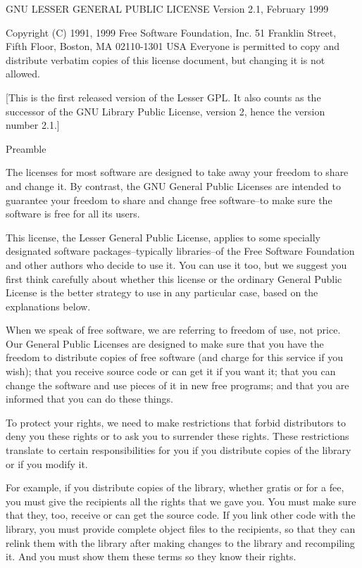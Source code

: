 GNU LESSER GENERAL PUBLIC LICENSE Version 2.1, February 1999

Copyright (C) 1991, 1999 Free Software Foundation, Inc. 51 Franklin Street, Fifth Floor, Boston, MA 02110-1301 USA Everyone is permitted to copy and distribute verbatim copies of this license document, but changing it is not allowed.

\mbox{[}This is the first released version of the Lesser GPL. It also counts as the successor of the GNU Library Public License, version 2, hence the version number 2.1.\mbox{]}

Preamble

The licenses for most software are designed to take away your freedom to share and change it. By contrast, the GNU General Public Licenses are intended to guarantee your freedom to share and change free software--to make sure the software is free for all its users.

This license, the Lesser General Public License, applies to some specially designated software packages--typically libraries--of the Free Software Foundation and other authors who decide to use it. You can use it too, but we suggest you first think carefully about whether this license or the ordinary General Public License is the better strategy to use in any particular case, based on the explanations below.

When we speak of free software, we are referring to freedom of use, not price. Our General Public Licenses are designed to make sure that you have the freedom to distribute copies of free software (and charge for this service if you wish); that you receive source code or can get it if you want it; that you can change the software and use pieces of it in new free programs; and that you are informed that you can do these things.

To protect your rights, we need to make restrictions that forbid distributors to deny you these rights or to ask you to surrender these rights. These restrictions translate to certain responsibilities for you if you distribute copies of the library or if you modify it.

For example, if you distribute copies of the library, whether gratis or for a fee, you must give the recipients all the rights that we gave you. You must make sure that they, too, receive or can get the source code. If you link other code with the library, you must provide complete object files to the recipients, so that they can relink them with the library after making changes to the library and recompiling it. And you must show them these terms so they know their rights.

